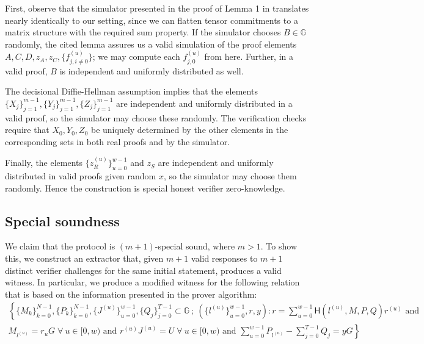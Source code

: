 \documentclass[draft]{article}
\newcommand{\G}{\mathbb{G}}
\newcommand{\hs}{\mathsf{H}}
\begin{document}
First, observe that the simulator presented in the proof of Lemma 1 in \cite{bootle} translates nearly identically to our setting, since we can flatten tensor commitments to a matrix structure with the required sum property.
If the simulator chooses $B \in \G$ randomly, the cited lemma assures us a valid simulation of the proof elements $A,C,D,z_A,z_C,\{f^{(u)}_{j,i \neq 0}\}$; we may compute each $f^{(u)}_{j,0}$ from here.
Further, in a valid proof, $B$ is independent and uniformly distributed as well.

The decisional Diffie-Hellman assumption implies that the elements $\{X_j\}_{j=1}^{m-1}, \{Y_j\}_{j=1}^{m-1}, \{Z_j\}_{j=1}^{m-1}$ are independent and uniformly distributed in a valid proof, so the simulator may choose these randomly.
The verification checks require that $X_0,Y_0,Z_0$ be uniquely determined by the other elements in the corresponding sets in both real proofs and by the simulator.

Finally, the elements $\{z^{(u)}_R\}_{u=0}^{w-1}$ and $z_S$ are independent and uniformly distributed in valid proofs given random $x$, so the simulator may choose them randomly.
Hence the construction is special honest verifier zero-knowledge.


\subsection{Special soundness}
We claim that the protocol is $(m+1)$-special sound, where $m > 1$.
To show this, we construct an extractor that, given $m+1$ valid responses to $m+1$ distinct verifier challenges for the same initial statement, produces a valid witness.
In particular, we produce a modified witness for the following relation that is based on the information presented in the prover algorithm:
\begin{multline*}
\left\{ \{M_k\}_{k=0}^{N-1},\{P_k\}_{k=0}^{N-1},\{J^{(u)}\}_{u=0}^{w-1},\{Q_j\}_{j=0}^{T-1} \subset \G \: ; \: \left( \{l^{(u)}\}_{u=0}^{w-1}, r, y \right) : r = \sum_{u=0}^{w-1} \hs(l^{(u)},M,P,Q)r^{(u)} \text{ and } \right. \\
\left. M_{l^{(u)}} = r_uG \; \forall \: u \in [0,w) \text{ and } r^{(u)}J^{(u)} = U \; \forall \: u \in [0,w) \text{ and } \sum_{u=0}^{w-1} P_{l^{(u)}} - \sum_{j=0}^{T-1} Q_j = yG \right\}
\end{multline*}
\end{document}
